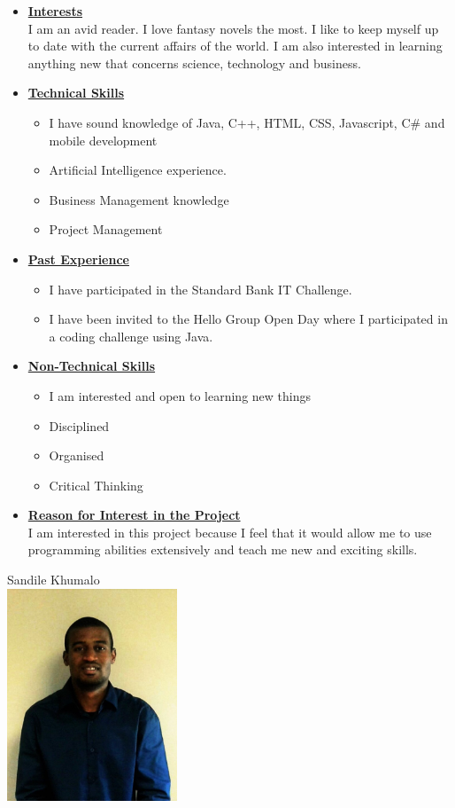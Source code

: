 \documentclass[a4paper,12pt]{article}
\begin{document}
\begin{itemize}
\item {\large \underline{\textbf{Interests}}}\\[0.2cm]
I am an avid reader. I love fantasy novels the most. I like to keep myself up to date with the current affairs of the world. I am also interested in learning anything new that concerns science, technology and business.
\\
\item {\large \underline{\textbf{Technical Skills}}}
	\begin{itemize}
		\item I have sound knowledge of Java, C++, HTML, CSS, Javascript, C\# and mobile development 
		\item Artificial Intelligence experience.
		\item Business Management knowledge
		\item Project Management
	\end{itemize}
\bigskip
\item {\large \underline{\textbf{Past Experience}}}
\begin{itemize}
\item I have participated in the Standard Bank IT Challenge.
\item I have been invited to the Hello Group Open Day where I participated in a coding challenge using Java.
\end{itemize}
\bigskip
\item {\large \underline{\textbf{Non-Technical Skills}}}
\begin{itemize}
\item I am interested and open to learning new things
\item Disciplined
\item Organised
\item Critical Thinking
\end{itemize}
\bigskip
\item {\large \underline{\textbf{Reason for Interest in the Project}}}\\[0.2cm]
I am interested in this project because I feel that it would allow me to use programming abilities extensively and teach me new and exciting skills.

\newpage
\end{itemize}
\begin{center}
{\Large Sandile {Khumalo}} \\[0.3cm]
\includegraphics[width=2in]{Sandile.jpg}\\[0.4cm] 
\end{center}
\end{document}
